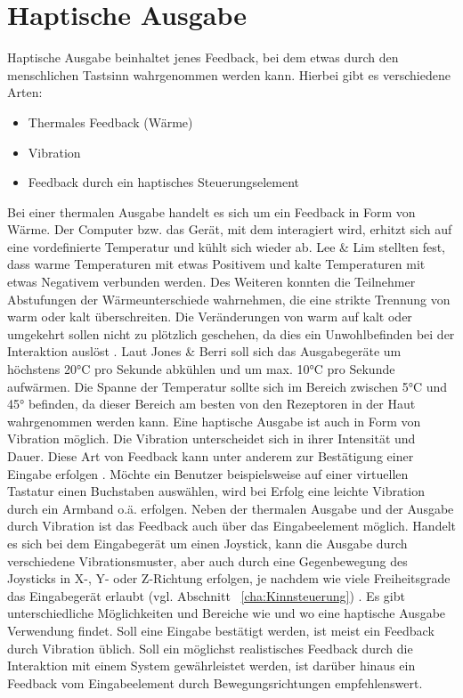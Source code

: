 \section{Haptische Ausgabe}
Haptische Ausgabe beinhaltet jenes Feedback, bei dem etwas durch den menschlichen Tastsinn wahrgenommen werden kann. Hierbei gibt es verschiedene Arten:
%
%
\begin{itemize}
      \item Thermales Feedback (\zB Wärme)
      \item Vibration
			\item Feedback durch ein haptisches Steuerungselement
\end{itemize}
\vspace{\baselineskip}
%
%
Bei einer thermalen Ausgabe handelt es sich um ein Feedback in Form von Wärme. Der Computer bzw. das Gerät, mit dem interagiert wird, erhitzt sich auf eine vordefinierte Temperatur und kühlt sich wieder ab. Lee \& Lim \cite{LeeLim} stellten fest, dass warme Temperaturen mit etwas Positivem und kalte Temperaturen mit etwas Negativem verbunden werden. Des Weiteren konnten die Teilnehmer Abstufungen der Wärmeunterschiede wahrnehmen, die eine strikte Trennung von warm oder kalt überschreiten. Die Veränderungen von warm auf kalt oder umgekehrt sollen nicht zu plötzlich geschehen, da dies ein Unwohlbefinden bei der Interaktion auslöst \cite{LeeLim}. \newline
Laut Jones \& Berri \cite{JonesBerris} soll sich das Ausgabegeräte um höchstens 20°C pro Sekunde abkühlen und um max. 10°C pro Sekunde aufwärmen. Die Spanne der Temperatur sollte sich im Bereich zwischen 5°C und 45° befinden, da dieser Bereich am besten von den Rezeptoren in der Haut wahrgenommen werden kann.
\newline \newline
Eine haptische Ausgabe ist auch in Form von Vibration möglich. Die Vibration unterscheidet sich in ihrer Intensität und Dauer. Diese Art von Feedback kann unter anderem zur Bestätigung einer Eingabe erfolgen \cite{Vibration}. Möchte ein Benutzer beispielsweise auf einer virtuellen Tastatur einen Buchstaben auswählen, wird bei Erfolg eine leichte Vibration durch ein Armband o.ä. erfolgen.
\newline \newline
Neben der thermalen Ausgabe und der Ausgabe durch Vibration ist das Feedback auch über das Eingabeelement möglich. Handelt es sich bei dem Eingabegerät um einen Joystick, kann die Ausgabe durch verschiedene Vibrationsmuster, aber auch durch eine Gegenbewegung des Joysticks in X-, Y- oder Z-Richtung erfolgen, je nachdem wie viele Freiheitsgrade das Eingabegerät erlaubt (vgl. Abschnitt ~\ref{cha:Kinnsteuerung}) \cite{an2002haptic}. 
\newline \newline
Es gibt unterschiedliche Möglichkeiten und Bereiche wie und wo eine haptische Ausgabe Verwendung findet. Soll eine Eingabe bestätigt werden, ist meist ein Feedback durch Vibration üblich. Soll ein möglichst realistisches Feedback durch die Interaktion mit einem System gewährleistet werden, ist darüber hinaus ein Feedback vom Eingabeelement durch Bewegungsrichtungen empfehlenswert.  
\newpage
